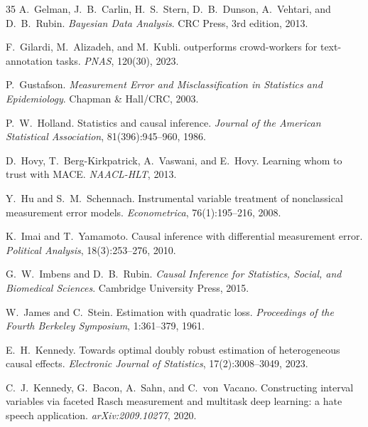 \documentclass[11pt,twocolumn]{article}
\begin{document}
\begin{thebibliography}{35}
A.~Gelman, J.~B.~Carlin, H.~S.~Stern, D.~B.~Dunson, A.~Vehtari, and D.~B.~Rubin.
\newblock \emph{Bayesian Data Analysis}.
\newblock CRC Press, 3rd edition, 2013.

F.~Gilardi, M.~Alizadeh, and M.~Kubli.
 outperforms crowd-workers for text-annotation tasks.
\newblock \emph{PNAS}, 120(30), 2023.

P.~Gustafson.
\newblock \emph{Measurement Error and Misclassification in Statistics and Epidemiology}.
\newblock Chapman \& Hall/CRC, 2003.

P.~W.~Holland.
\newblock Statistics and causal inference.
\newblock \emph{Journal of the American Statistical Association}, 81(396):945--960, 1986.

D.~Hovy, T.~Berg-Kirkpatrick, A.~Vaswani, and E.~Hovy.
\newblock Learning whom to trust with {MACE}.
\newblock \emph{NAACL-HLT}, 2013.

Y.~Hu and S.~M.~Schennach.
\newblock Instrumental variable treatment of nonclassical measurement error models.
\newblock \emph{Econometrica}, 76(1):195--216, 2008.

K.~Imai and T.~Yamamoto.
\newblock Causal inference with differential measurement error.
\newblock \emph{Political Analysis}, 18(3):253--276, 2010.

G.~W.~Imbens and D.~B.~Rubin.
\newblock \emph{Causal Inference for Statistics, Social, and Biomedical Sciences}.
\newblock Cambridge University Press, 2015.

W.~James and C.~Stein.
\newblock Estimation with quadratic loss.
\newblock \emph{Proceedings of the Fourth Berkeley Symposium}, 1:361--379, 1961.

E.~H.~Kennedy.
\newblock Towards optimal doubly robust estimation of heterogeneous causal effects.
\newblock \emph{Electronic Journal of Statistics}, 17(2):3008--3049, 2023.

C.~J.~Kennedy, G.~Bacon, A.~Sahn, and C.~von~Vacano.
\newblock Constructing interval variables via faceted {R}asch measurement and multitask deep learning: a hate speech application.
\newblock \emph{arXiv:2009.10277}, 2020.


\end{thebibliography}
\end{document}

